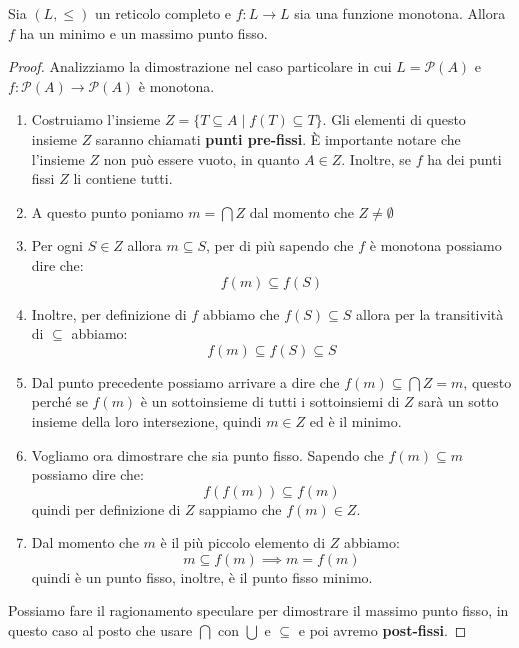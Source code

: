 \begin{teorema}
    Sia $(L,\leq)$ un reticolo completo e $f: L \to L$ sia una funzione monotona.
    Allora $f$ ha un minimo e un massimo punto fisso.
    \begin{proof}
        Analizziamo la dimostrazione nel caso particolare in cui $L = \mathcal{P}(A)$
        e $f: \mathcal{P}(A) \to \mathcal{P}(A)$ è monotona.
        \begin{enumerate}
            \item Costruiamo l'insieme $Z = \{T \subseteq A \mid f(T) \subseteq
                      T\}$. Gli elementi di questo insieme $Z$ saranno chiamati
                  \textbf{punti pre-fissi}. È importante notare che l'insieme $Z$
                  non può essere vuoto, in quanto $A \in Z$. Inoltre, se $f$ ha
                  dei punti fissi $Z$ li contiene tutti.
            \item A questo punto poniamo $m = \bigcap Z$ dal momento che $Z \neq
                      \emptyset$
            \item Per ogni $S \in Z$ allora $m \subseteq S$, per di più sapendo
                  che $f$ è monotona possiamo dire che:
                  \begin{equation}
                      f(m) \subseteq f(S)
                  \end{equation}
            \item Inoltre, per definizione di $f$ abbiamo che $f(S) \subseteq S$
                  allora per la transitività di $\subseteq$ abbiamo:
                  \begin{equation}
                      f(m) \subseteq f(S) \subseteq S
                  \end{equation}
            \item Dal punto precedente possiamo arrivare a dire che $f(m) \subseteq
                      \bigcap Z = m$, questo perché se $f(m)$ è un sottoinsieme di
                  tutti i sottoinsiemi di $Z$ sarà un sotto insieme della loro
                  intersezione, quindi $m \in Z$ ed è il minimo.
            \item Vogliamo ora dimostrare che sia punto fisso. Sapendo che
                  $f(m) \subseteq m$ possiamo dire che:
                  \begin{equation}
                      f(f(m)) \subseteq f(m)
                  \end{equation}
                  quindi per definizione di $Z$ sappiamo che $f(m)\in Z$.
            \item Dal momento che $m$ è il più piccolo elemento di $Z$ abbiamo:
                  \begin{equation}
                      m \subseteq f(m) \implies m = f(m)
                  \end{equation}
                  quindi è un punto fisso, inoltre, è il punto fisso minimo.
        \end{enumerate}
        Possiamo fare il ragionamento speculare per dimostrare il massimo punto
        fisso, in questo caso al posto che usare $\bigcap$ con $\bigcup$ e $\subseteq$
        e poi avremo \textbf{post-fissi}.
    \end{proof}
\end{teorema}
